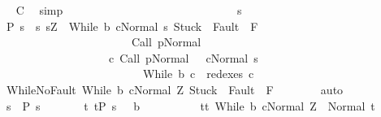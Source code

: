 \begin{isabellebody}
\ \isamarkupfalse%
\ {\isacharquery}C{}\ \isamarkupfalse%
\ simp\isanewline
\ \ \ \ \ \ \ \ \isamarkupfalse%
\isanewline
\ \ \ \ \ \ \isamarkupfalse%
\isanewline
\ \ \ \ \isamarkupfalse%
\isanewline
\ \ \isamarkupfalse%
\ \isanewline
\ \ \ \ \isamarkupfalse%
\ s\isanewline
\ \ \ \ \isamarkupfalse%
\ P{\isacharcolon}\ {\isachardoublequoteopen}s\ {\isasymin}\ {\isacharbraceleft}s{\isachardot}\ s{\isacharequal}Z\ {\isasymand}\ {\isasymGamma}{\isasymturnstile}{\isasymlangle}While\ b\ c{\isacharcomma}Normal\ s{\isasymrangle}\ {\isasymRightarrow}{\isasymnotin}{\isacharparenleft}{\isacharbraceleft}Stuck{\isacharbraceright}\ {\isasymunion}\ Fault\ {\isacharbackquote}\ {\isacharparenleft}{\isacharminus}F{\isacharparenright}{\isacharparenright}\ {\isasymand}\ \isanewline
\ \ \ \ \ \ \ \ \ \ \ \ \ \ \ \ \ \ \ \ \ \ \ {\isasymGamma}{\isasymturnstile}Call\ p{\isasymdown}Normal\ {\isasymsigma}\ {\isasymand}\isanewline
\ \ \ \ \ \ \ \ \ \ \ \ \ \ \ \ \ \ \ {\isacharparenleft}{\isasymexists}c{\isacharprime}{\isachardot}\ {\isasymGamma}{\isasymturnstile}{\isacharparenleft}Call\ p{\isacharcomma}Normal\ {\isasymsigma}{\isacharparenright}\ {\isasymrightarrow}\isactrlsup {\isacharplus}\ {\isacharparenleft}c{\isacharprime}{\isacharcomma}Normal\ s{\isacharparenright}\ {\isasymand}\ \isanewline
\ \ \ \ \ \ \ \ \ \ \ \ \ \ \ \ \ \ \ \ \ \ \ \ \ While\ b\ c\ {\isasymin}\ redexes\ c{\isacharprime}{\isacharparenright}{\isacharbraceright}{\isachardoublequoteclose}\isanewline
\ \ \ \ \isamarkupfalse%
\ WhileNoFault{\isacharcolon}\ {\isachardoublequoteopen}{\isasymGamma}{\isasymturnstile}{\isasymlangle}While\ b\ c{\isacharcomma}Normal\ Z{\isasymrangle}\ {\isasymRightarrow}{\isasymnotin}{\isacharparenleft}{\isacharbraceleft}Stuck{\isacharbraceright}\ {\isasymunion}\ Fault\ {\isacharbackquote}\ {\isacharparenleft}{\isacharminus}F{\isacharparenright}{\isacharparenright}{\isachardoublequoteclose}\isanewline
\ \ \ \ \ \ \isamarkupfalse%
\ auto\isanewline
\ \ \ \ \isamarkupfalse%
\ {\isachardoublequoteopen}s\ {\isasymin}\ {\isacharquery}P{\isacharprime}\ s\ {\isasymand}\ \isanewline
\ \ \ \ \ {\isacharparenleft}{\isasymforall}t{\isachardot}\ t{\isasymin}{\isacharparenleft}{\isacharquery}P{\isacharprime}\ s\ {\isasyminter}\ {\isacharminus}\ b{\isacharparenright}{\isasymlongrightarrow}\isanewline
\ \ \ \ \ \ \ \ \ \ t{\isasymin}{\isacharbraceleft}t{\isachardot}\ {\isasymGamma}{\isasymturnstile}{\isasymlangle}While\ b\ c{\isacharcomma}Normal\ Z{\isasymrangle}\ {\isasymRightarrow}\ Normal\ t{\isacharbraceright}{\isacharparenright}{\isasymand}\isanewline

\end{isabellebody}
